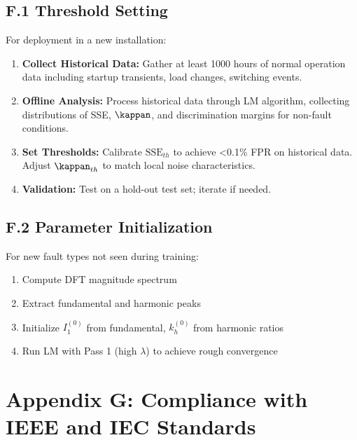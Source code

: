 \subsection*{F.1 Threshold Setting}

For deployment in a new installation:

\begin{enumerate}
    \item \textbf{Collect Historical Data:} Gather at least 1000 hours of normal operation 
    data including startup transients, load changes, switching events.
    
    \item \textbf{Offline Analysis:} Process historical data through LM algorithm, collecting 
    distributions of SSE, $\kappan$, and discrimination margins for non-fault conditions.
    
    \item \textbf{Set Thresholds:} Calibrate $\text{SSE}_{th}$ to achieve <0.1\% FPR on 
    historical data. Adjust $\kappan_{th}$ to match local noise characteristics.
    
    \item \textbf{Validation:} Test on a hold-out test set; iterate if needed.
\end{enumerate}

\subsection*{F.2 Parameter Initialization}

For new fault types not seen during training:

\begin{enumerate}
    \item Compute DFT magnitude spectrum
    \item Extract fundamental and harmonic peaks
    \item Initialize $I_1^{(0)}$ from fundamental, $k_h^{(0)}$ from harmonic ratios
    \item Run LM with Pass 1 (high $\lambda$) to achieve rough convergence
\end{enumerate}


\section*{Appendix G: Compliance with IEEE and IEC Standards}

